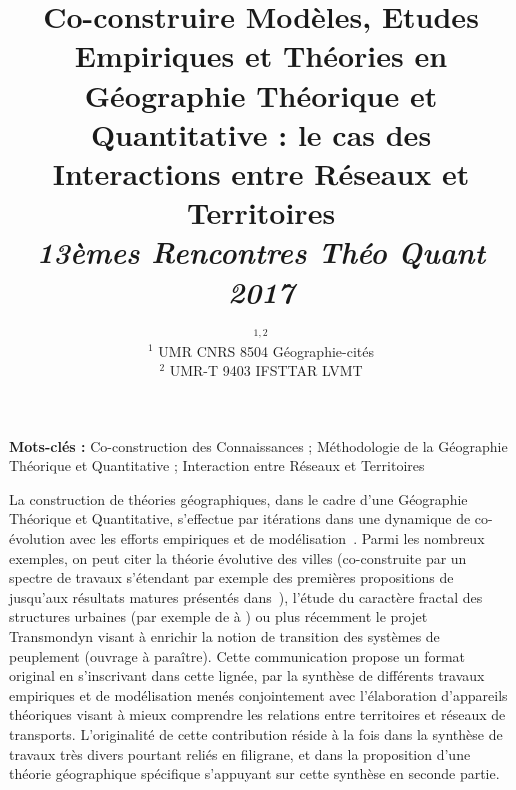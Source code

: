 




\title{Co-construire Modèles, Etudes Empiriques et Théories en Géographie Théorique et Quantitative : le cas des Interactions entre Réseaux et Territoires\\\bigskip
\textit{13èmes Rencontres Théo Quant 2017}\\\bigskip
}
\author{$^{1,2}$\\
$^1$ UMR CNRS 8504 Géographie-cités\\
$^2$ UMR-T 9403 IFSTTAR LVMT
}
\date{}

\maketitle

\justify


\begin{abstract}
\end{abstract}


\textbf{Mots-clés : } Co-construction des Connaissances ; Méthodologie de la Géographie Théorique et Quantitative ; Interaction entre Réseaux et Territoires

\bigskip


La construction de théories géographiques, dans le cadre d'une Géographie Théorique et Quantitative, s'effectue par itérations dans une dynamique de co-évolution avec les efforts empiriques et de modélisation~\cite{livet2010}. Parmi les nombreux exemples, on peut citer la théorie évolutive des villes (co-construite par un spectre de travaux s'étendant par exemple des premières propositions de \cite{pumain1997pour} jusqu'aux résultats matures présentés dans~\cite{pumain2012multi}), l'étude du caractère fractal des structures urbaines (par exemple de \cite{frankhauser1998fractal} à \cite{frankhauser2008fractal}) ou plus récemment le projet Transmondyn visant à enrichir la notion de transition des systèmes de peuplement (ouvrage à paraître). Cette communication propose un format original en s'inscrivant dans cette lignée, par la synthèse de différents travaux empiriques et de modélisation menés conjointement avec l'élaboration d'appareils théoriques visant à mieux comprendre les relations entre territoires et réseaux de transports. L'originalité de cette contribution réside à la fois dans la synthèse de travaux très divers pourtant reliés en filigrane, et dans la proposition d'une théorie géographique spécifique s'appuyant sur cette synthèse en seconde partie.



